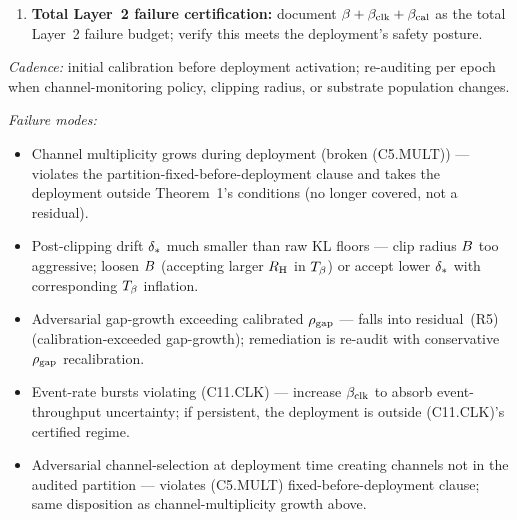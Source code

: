 \begin{enumerate}
\begin{itemize}
    permits; $\Tbeta$ scales as $\log(1/\beta)$.
  \item \emph{Increase $\alpha$} (loosen the SPRT Type-I tolerance,
    accepting more false alarms) — reduces $A = \log((1-\beta)/\alpha)$
    linearly; trade-off is alarm-fatigue / operator-cost.
  \item \emph{Increase $\Ncasc$} — extend the operational period or
    raise the event-throughput floor (deployment instrumentation:
    higher monitoring rate, longer cascade-time floor).
  \end{itemize}
  Tightening $\beta$ or raising $\Bclip$ \emph{increase} $\Tbeta$
  and therefore make the inequality harder to satisfy --- the
  remediation directions go the other way.
\item \textbf{Total Layer~2 failure certification:} document
  $\beta + \beta_{\mathrm{clk}} + \beta_{\mathrm{cal}}$ as the total Layer~2 failure budget;
  verify this meets the deployment's safety posture.
\end{enumerate}

\emph{Cadence:} initial calibration before deployment activation;
re-auditing per epoch when channel-monitoring policy, clipping
radius, or substrate population changes.

\emph{Failure modes:}
\begin{itemize}
\item Channel multiplicity grows during deployment (broken
  (C5.MULT)) — violates the partition-fixed-before-deployment
  clause and takes the deployment outside Theorem~1's conditions
  (no longer covered, not a residual).
\item Post-clipping drift $\delta_{*}$ much smaller than raw KL
  floors — clip radius $\Bclip$ too aggressive; loosen $\Bclip$
  (accepting larger $R_{\mathrm{H}}$ in $\Tbeta$) or accept lower $\delta_{*}$
  with corresponding $\Tbeta$ inflation.
\item Adversarial gap-growth exceeding calibrated $\rho_{\mathrm{gap}}$ —
  falls into residual~(R5) (calibration-exceeded gap-growth);
  remediation is re-audit with conservative $\rho_{\mathrm{gap}}$ recalibration.
\item Event-rate bursts violating (C11.CLK) — increase $\beta_{\mathrm{clk}}$ to
  absorb event-throughput uncertainty; if persistent, the
  deployment is outside (C11.CLK)'s certified regime.
\item Adversarial channel-selection at deployment time creating channels not in
    the audited partition — violates (C5.MULT) fixed-before-deployment clause;
    same disposition as channel-multiplicity growth above.
\end{itemize}

